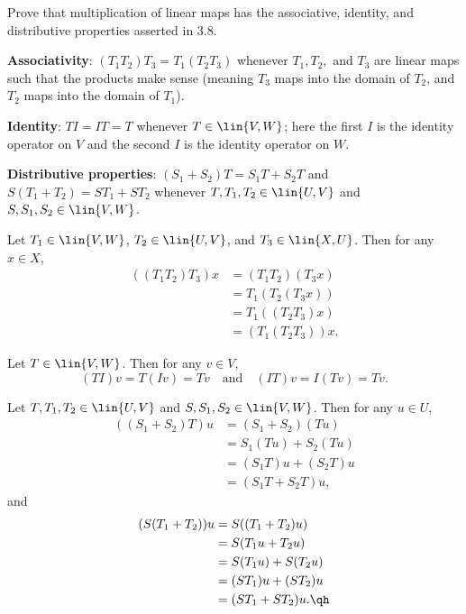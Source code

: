 \begin{exercise}[3a6]
    Prove that multiplication of linear maps has the associative, identity, and distributive properties asserted in 3.8.
    \begin{subexercises}
        \item \textbf{Associativity}: $(T_1T_2)T_3 = T_1(T_2T_3)$ whenever $T_1, T_2,$ and $T_3$ are linear maps such that the products make sense (meaning $T_3$ maps into the domain of $T_2$, and $T_2$ maps into the domain of $T_1$).
        \item \textbf{Identity}: $TI = IT = T$ whenever $T \in \lin{V, W}$; here the first $I$ is the identity operator on $V$ and the second $I$ is the identity operator on $W$.
        \item \textbf{Distributive properties}: $(S_1 + S_2)T = S_1T + S_2T$ and $S(T_1 + T_2) = ST_1 + ST_2$ whenever $T, T_1, T_2 \in \lin{U, V}$ and $S, S_1, S_2 \in \lin{V, W}$.
    \end{subexercises}
\end{exercise}

\begin{sole}
    \item Let $T_1 \in \lin{V, W}$, $T_2 \in \lin{U, V}$, and $T_3 \in \lin{X, U}$. Then for any $x \in X$,
    \begin{align*}
        ((T_1T_2)T_3)x & = (T_1T_2)(T_3x) \\
        & = T_1(T_2(T_3x)) \\
        & = T_1((T_2T_3)x) \\
        & = (T_1(T_2T_3))x.
    \end{align*}
    \item Let $T \in \lin{V, W}$. Then for any $v \in V$,
    \[(TI)v = T(Iv) = Tv \quad \text{and} \quad (IT)v = I(Tv) = Tv.\]
    \item Let $T, T_1, T_2 \in \lin{U, V}$ and $S, S_1, S_2 \in \lin{V, W}$. Then for any $u \in U$,
    \begin{align*}
        ((S_1 + S_2)T)u & = (S_1 + S_2)(Tu) \\
        & = S_1(Tu) + S_2(Tu) \\
        & = (S_1T)u + (S_2T)u \\
        & = (S_1T + S_2T)u,
    \end{align*}
    and
    \begin{align*}
        (S(T_1 + T_2))u & = S((T_1 + T_2)u) \\
        & = S(T_1u + T_2u) \\
        & = S(T_1u) + S(T_2u) \\
        & = (ST_1)u + (ST_2)u \\
        & = (ST_1 + ST_2)u. \qh
    \end{align*}
\end{sole}


